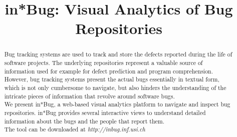 


\usepackage{xspace,graphicx,url,paralist}
\usepackage{xcolor,colortbl}

\usepackage{microtype}


\newcommand{\ie}{\textit{i.e.,}\xspace}
\newcommand{\eg}{\textit{e.g.,}\xspace}
\newcommand{\etc}{\textit{etc.}\xspace}
\newcommand{\etal}{\textit{et al.}\xspace}
\newcommand{\ib}{in*Bug\xspace}
\newcommand{\secref}[1]{Section~\ref{#1}\xspace}
\newcommand{\figref}[1]{Figure~\ref{#1}\xspace}
\newcommand{\tabref}[1]{Table~\ref{#1}\xspace}

\hyphenation{}



\title{in*Bug: Visual Analytics of Bug Repositories}

\author{
}

\maketitle
\IEEEpeerreviewmaketitle

\begin{abstract}

Bug tracking systems are used to track and store the defects reported during the life of software projects. The underlying repositories represent a valuable source of information used for example for defect prediction and program comprehension. However, bug tracking systems present the actual bugs essentially in textual form, which is not only cumbersome to navigate, but also hinders the understanding of the intricate pieces of information that revolve around software bugs.\\
We present in*Bug, a web-based visual analytics platform to navigate and inspect bug repositories. in*Bug provides several interactive views to understand detailed information about the bugs and the people that report them. \\
The tool can be downloaded at \textit{http://inbug.inf.usi.ch}

\end{abstract}


